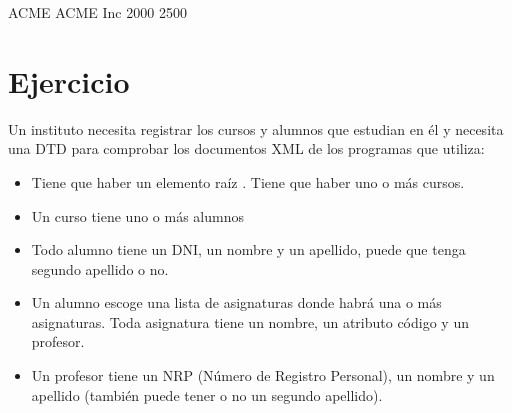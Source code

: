 \documentclass[letterpaper,10pt,spanish]{sphinxmanual}
\begin{document}
\begin{sphinxVerbatim}[commandchars=\\\{\}]
   
         
          ACME
         
          ACME Inc
          2000
        2500
\end{sphinxVerbatim}


\section{Ejercicio}
\label{\detokenize{tema5:ejercicio}}
Un instituto necesita registrar los cursos y alumnos que estudian en él y necesita una DTD para comprobar los documentos XML de los programas que utiliza:
\begin{itemize}
\item {} 
Tiene que haber un elemento raíz . Tiene que haber uno o más cursos.

\item {} 
Un curso tiene uno o más alumnos

\item {} 
Todo alumno tiene un DNI, un nombre y un apellido, puede que tenga segundo apellido o no.

\item {} 
Un alumno escoge una lista de asignaturas donde habrá una o más asignaturas. Toda asignatura tiene un nombre, un atributo código y un profesor.

\item {} 
Un profesor tiene un NRP (Número de Registro Personal), un nombre y un apellido (también puede tener o no un segundo apellido).

\end{itemize}
\end{document}
